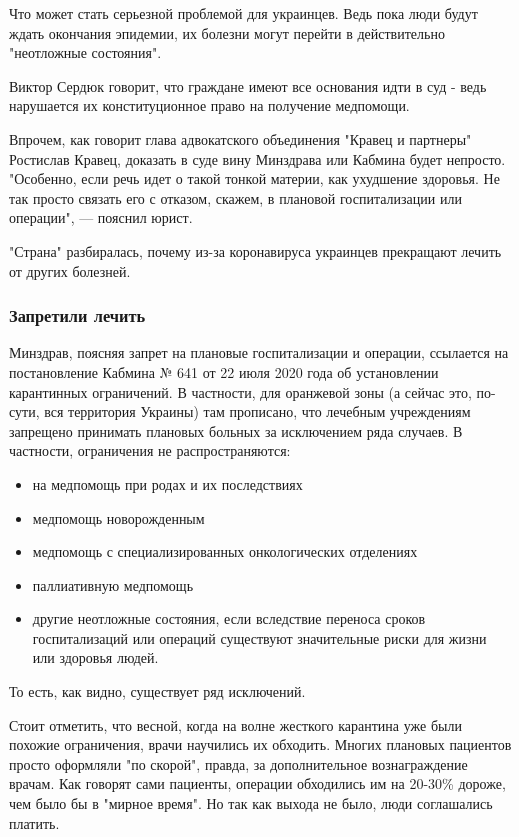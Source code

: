 Что может стать серьезной проблемой для украинцев. Ведь пока люди будут ждать
окончания эпидемии, их болезни могут перейти в действительно "неотложные
состояния".

Виктор Сердюк говорит, что граждане имеют все основания идти в суд - ведь
нарушается их конституционное право на получение медпомощи.

Впрочем, как говорит глава адвокатского объединения "Кравец и партнеры"
Ростислав Кравец, доказать в суде вину Минздрава или Кабмина будет непросто.
"Особенно, если речь идет о такой тонкой материи, как ухудшение здоровья. Не
так просто связать его с отказом, скажем, в плановой госпитализации или
операции", — пояснил юрист.

"Страна" разбиралась, почему из-за коронавируса украинцев прекращают лечить от
других болезней.

\subsubsection{Запретили лечить}

Минздрав, поясняя запрет на плановые госпитализации и операции, ссылается на
постановление Кабмина № 641 от 22 июля 2020 года об установлении карантинных
ограничений. В частности, для оранжевой зоны (а сейчас это, по-сути, вся
территория Украины) там прописано, что лечебным учреждениям запрещено принимать
плановых больных за исключением ряда случаев. В частности, ограничения не
распространяются:

\begin{itemize}
\item на медпомощь при родах и их последствиях
\item медпомощь новорожденным
\item медпомощь с специализированных онкологических отделениях
\item паллиативную медпомощь
\item другие неотложные состояния, если вследствие переноса сроков госпитализаций или
операций существуют значительные риски для жизни или здоровья
людей.
\end{itemize}

То есть, как видно, существует ряд исключений.

Стоит отметить, что весной, когда на волне жесткого карантина уже были похожие
ограничения, врачи научились их обходить. Многих плановых пациентов просто
оформляли "по скорой", правда, за дополнительное вознаграждение врачам. Как
говорят сами пациенты, операции обходились им на 20-30\% дороже, чем было бы в
"мирное время". Но так как выхода не было, люди соглашались платить.

